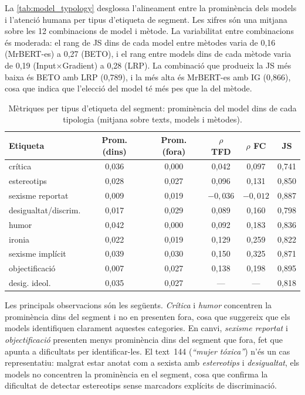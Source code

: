 La \autoref{tab:model_typology} desglossa l'alineament entre la prominència dels models i l'atenció humana per tipus d'etiqueta de segment.
Les xifres són una mitjana sobre les 12 combinacions de model i mètode.
La variabilitat entre combinacions és moderada: el rang de JS dins de cada model entre mètodes varia de 0,16 (MrBERT-es) a 0,27 (BETO), i el rang entre models dins de cada mètode varia de 0,19 (Input$\times$Gradient) a 0,28 (LRP).
La combinació que produeix la JS més baixa és BETO amb LRP (0,789), i la més alta és MrBERT-es amb IG (0,866), cosa que indica que l'elecció del model té més pes que la del mètode.

\iftables
\begin{table}[htbp]
\small
\centering
\begin{tabular}{lccccc}
\toprule
\textbf{Etiqueta} & \textbf{Prom. (dins)} & \textbf{Prom. (fora)} & \textbf{$\rho$ TFD} & \textbf{$\rho$ FC} & \textbf{JS} \\
\midrule
crítica                 & 0,036 & 0,000 & 0,042 & 0,097 & 0,741 \\
estereotips             & 0,028 & 0,027 & 0,096 & 0,131 & 0,850 \\
sexisme reportat        & 0,009 & 0,019 & $-0,036$ & $-0,012$ & 0,887 \\
desigualtat/discrim.    & 0,017 & 0,029 & 0,089 & 0,160 & 0,798 \\
humor                   & 0,042 & 0,000 & 0,092 & 0,183 & 0,836 \\
ironia                  & 0,022 & 0,019 & 0,129 & 0,259 & 0,822 \\
sexisme implícit        & 0,039 & 0,030 & 0,150 & 0,325 & 0,871 \\
objectificació          & 0,007 & 0,027 & 0,138 & 0,198 & 0,895 \\
desig. ideol.           & 0,035 & 0,027 & --- & --- & 0,818 \\
\bottomrule
\end{tabular}
\caption{Mètriques per tipus d'etiqueta del segment: prominència del model dins de cada tipologia (mitjana sobre texts, models i mètodes).}
\label{tab:model_typology}
\end{table}
\fi

Les principals observacions són les següents. \textit{Crítica} i \textit{humor} concentren la prominència dins del segment i no en presenten fora, cosa que suggereix que els models identifiquen clarament aquestes categories.
En canvi, \textit{sexisme reportat} i \textit{objectificació} presenten menys prominència dins del segment que fora, fet que apunta a dificultats per identificar-les.
El text~144 (\textit{``mujer tóxica''}) n'és un cas representatiu: malgrat estar anotat com a sexista amb \textit{estereotips} i \textit{desigualtat}, els models no concentren la prominència en el segment, cosa que confirma la dificultat de detectar estereotips sense marcadors explícits de discriminació.

